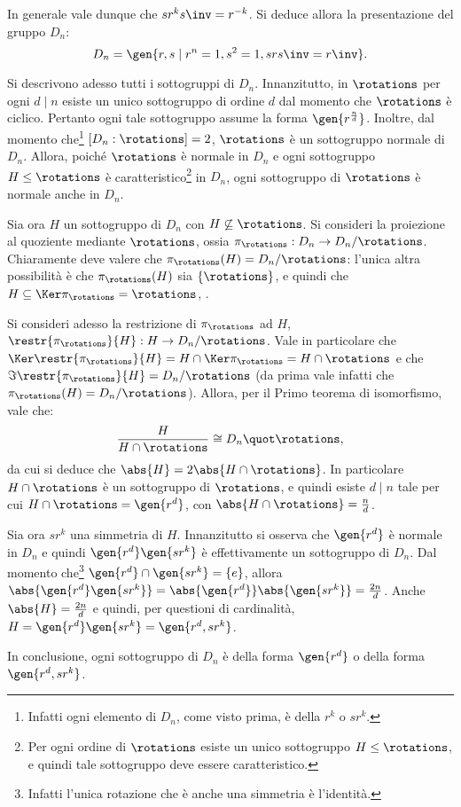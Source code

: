 \documentclass[12pt]{scrartcl}
\begin{document}
	
	In generale vale dunque che $s r^k s\inv = r^{-k}$. Si deduce allora la presentazione del gruppo $D_n$:
	\[ D_n = \gen{r,s \mid r^n = 1, s^2 = 1, s r s\inv = r\inv}. \] \smallskip
	
	
	Si descrivono adesso tutti i sottogruppi di $D_n$. Innanzitutto, in $\rotations$
	per ogni $d \mid n$ esiste un unico sottogruppo di ordine $d$ dal momento che
	$\rotations$ è ciclico. Pertanto ogni tale sottogruppo assume la forma
	$\gen{r^{\frac{n}{d}}}$. Inoltre, dal momento che\footnote{
		Infatti ogni elemento di $D_n$, come visto prima, è della $r^k$ o $s r^k$.
	} $[D_n : \rotations] = 2$, $\rotations$ è un sottogruppo normale di
	$D_n$. Allora, poiché $\rotations$ è normale in $D_n$ e ogni sottogruppo
	$H \leq \rotations$ è caratteristico\footnote{
		Per ogni ordine di $\rotations$ esiste un unico sottogruppo $H \leq \rotations$,
		e quindi tale sottogruppo deve essere caratteristico.
	} in $D_n$, ogni sottogruppo di $\rotations$ è normale anche in $D_n$. \medskip
	
	
	Sia ora $H$ un sottogruppo di $D_n$ con $H \not\subseteq \rotations$. Si consideri
	la proiezione al quoziente mediante $\rotations$, ossia $\pi_\rotations : D_n \to D_n /
	\rotations$. Chiaramente deve valere che $\pi_\rotations(H) = D_n / \rotations$: l'unica
	altra possibilità è che $\pi_\rotations(H)$ sia $\{\rotations\}$, e quindi che
	$H \subseteq \Ker \pi_\rotations = \rotations$, \Lightning. \medskip
	
	
	Si consideri adesso
	la restrizione di $\pi_\rotations$ ad $H$, $\restr{\pi_\rotations}{H} : H \to D_n / \rotations$. Vale in particolare che $\Ker \restr{\pi_\rotations}{H} = H \cap \Ker \pi_\rotations = H \cap \rotations$ e che $\Im \restr{\pi_\rotations}{H} = D_n / \rotations$
	(da prima vale infatti che $\pi_\rotations(H) = D_n / \rotations$). Allora, per il Primo
	teorema di isomorfismo, vale che:
	\[ \frac{H}{H \cap \rotations} \cong D_n \quot \rotations, \]
	da cui si deduce che $\abs{H} = 2 \abs{H \cap \rotations}$. In particolare $H \cap \rotations$ è un sottogruppo di $\rotations$, e quindi esiste $d \mid n$ tale per cui
	$H \cap \rotations = \gen{r^d}$, con $\abs{H \cap \rotations} = \frac{n}{d}$. \medskip
	
	
	Sia ora $s r^k$ una simmetria di $H$.
	Innanzitutto si osserva che $\gen{r^d}$ è normale in $D_n$ e quindi
	$\gen{ r^d }\gen{ s r^k }$ è effettivamente un sottogruppo di $D_n$. Dal momento che\footnote{
		Infatti l'unica rotazione che è anche una simmetria è l'identità.
	}
	$\gen{ r^d } \cap \gen{ s r^k } = \{ e \}$, allora $\abs{\gen{ r^d } \gen{ s r^k }} = \abs{\gen{r^d}} \abs{\gen{s r^k}} = \frac{2n}{d}$. Anche $\abs{H} = \frac{2n}{d}$ e
	quindi, per questioni di cardinalità, $H = \gen{ r^d } \gen{ s r^k } = \gen{ r^d, s r^k }$.
	\medskip
	
	
	In conclusione, ogni sottogruppo di $D_n$ è della forma $\gen{r^d}$ o della forma
	$\gen{r^d, sr^k}$.
\end{document}
